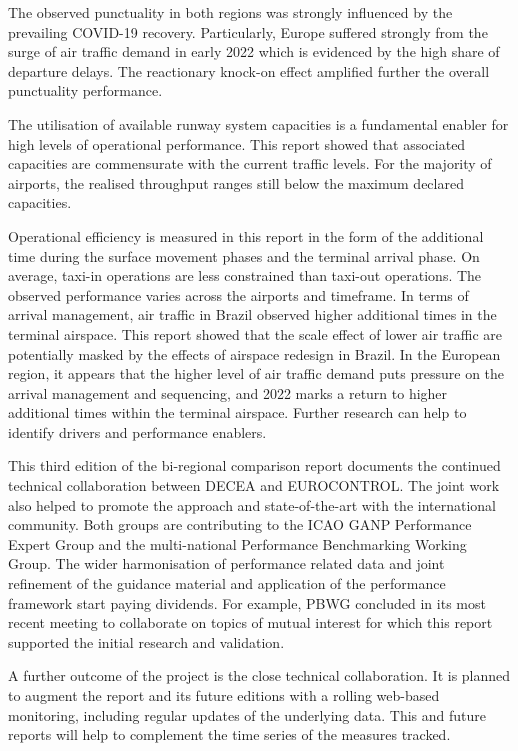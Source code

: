 \documentclass[
  a4paper,
  DIV=11,
  numbers=noendperiod]{scrreport}
\begin{document}
The observed punctuality in both regions was strongly influenced by the
prevailing COVID-19 recovery. Particularly, Europe suffered strongly
from the surge of air traffic demand in early 2022 which is evidenced by
the high share of departure delays. The reactionary knock-on effect
amplified further the overall punctuality performance.

The utilisation of available runway system capacities is a fundamental
enabler for high levels of operational performance. This report showed
that associated capacities are commensurate with the current traffic
levels. For the majority of airports, the realised throughput ranges
still below the maximum declared capacities.

Operational efficiency is measured in this report in the form of the
additional time during the surface movement phases and the terminal
arrival phase. On average, taxi-in operations are less constrained than
taxi-out operations. The observed performance varies across the airports
and timeframe. In terms of arrival management, air traffic in Brazil
observed higher additional times in the terminal airspace. This report
showed that the scale effect of lower air traffic are potentially masked
by the effects of airspace redesign in Brazil. In the European region,
it appears that the higher level of air traffic demand puts pressure on
the arrival management and sequencing, and 2022 marks a return to higher
additional times within the terminal airspace. Further research can help
to identify drivers and performance enablers.

This third edition of the bi-regional comparison report documents the
continued technical collaboration between DECEA and EUROCONTROL. The
joint work also helped to promote the approach and state-of-the-art with
the international community. Both groups are contributing to the ICAO
GANP Performance Expert Group and the multi-national Performance
Benchmarking Working Group. The wider harmonisation of performance
related data and joint refinement of the guidance material and
application of the performance framework start paying dividends. For
example, PBWG concluded in its most recent meeting to collaborate on
topics of mutual interest for which this report supported the initial
research and validation.

A further outcome of the project is the close technical collaboration.
It is planned to augment the report and its future editions with a
rolling web-based monitoring, including regular updates of the
underlying data. This and future reports will help to complement the
time series of the measures tracked.
\end{document}
